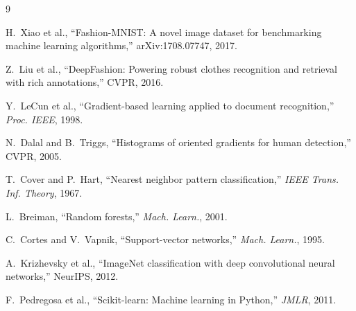 \documentclass[conference]{IEEEtran}
\begin{document}
\begin{thebibliography}{9}

H.~Xiao et al., ``Fashion-MNIST: A novel image dataset for benchmarking machine learning algorithms,'' arXiv:1708.07747, 2017.

Z.~Liu et al., ``DeepFashion: Powering robust clothes recognition and retrieval with rich annotations,'' CVPR, 2016.

Y.~LeCun et al., ``Gradient-based learning applied to document recognition,'' \emph{Proc. IEEE}, 1998.

N.~Dalal and B.~Triggs, ``Histograms of oriented gradients for human detection,'' CVPR, 2005.

T.~Cover and P.~Hart, ``Nearest neighbor pattern classification,'' \emph{IEEE Trans. Inf. Theory}, 1967.

L.~Breiman, ``Random forests,'' \emph{Mach. Learn.}, 2001.

C.~Cortes and V.~Vapnik, ``Support-vector networks,'' \emph{Mach. Learn.}, 1995.

A.~Krizhevsky et al., ``ImageNet classification with deep convolutional neural networks,'' NeurIPS, 2012.

F.~Pedregosa et al., ``Scikit-learn: Machine learning in Python,'' \emph{JMLR}, 2011.

\end{thebibliography}
\end{document}
